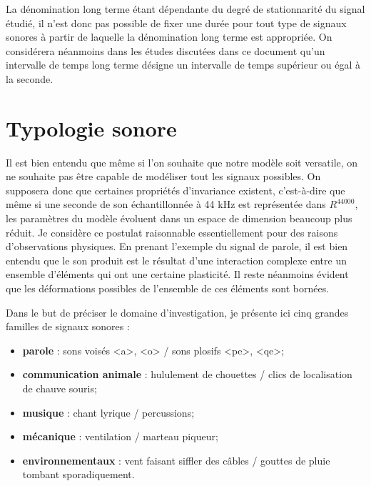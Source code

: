 
La dénomination \og long terme \fg  étant dépendante du degré de stationnarité du signal étudié, il n'est donc pas possible de fixer une durée pour tout type de signaux sonores à partir de laquelle la dénomination \og long terme \fg est appropriée. On considérera néanmoins dans les études discutées dans ce document qu'un intervalle de temps  \og long terme \fg désigne un intervalle de temps supérieur ou égal à la seconde.

\section{ \nmu Typologie sonore} \label{sec:typologie}

Il est bien entendu que même si l'on souhaite que notre modèle soit versatile, on ne souhaite pas être capable de modéliser tout les signaux possibles. On supposera donc que certaines propriétés d'invariance existent, c'est-à-dire que même si une seconde de son échantillonnée à 44 kHz est représentée dans $R^{44000}$, les paramètres du modèle évoluent dans un espace de dimension beaucoup plus réduit. Je considère ce postulat raisonnable essentiellement pour des raisons d'observations physiques. En prenant l'exemple du signal de parole, il est bien entendu que le son produit est le résultat d'une interaction complexe entre un ensemble d'éléments qui ont une certaine plasticité. Il reste néanmoins évident que les déformations possibles de l'ensemble de ces éléments sont bornées.

Dans le but de préciser le domaine d'investigation, je présente ici cinq grandes familles de signaux sonores :
\begin{itemize}
  \item \textbf{parole} : sons voisés <a>, <o> / sons plosifs <pe>, <qe>;
  \item \textbf{communication animale} : hululement de chouettes / clics de localisation de chauve souris;
  \item \textbf{musique} : chant lyrique / percussions;
  \item \textbf{mécanique} : ventilation / marteau piqueur;
  \item \textbf{environnementaux} : vent faisant siffler des câbles / gouttes de pluie tombant sporadiquement.
\end{itemize}

